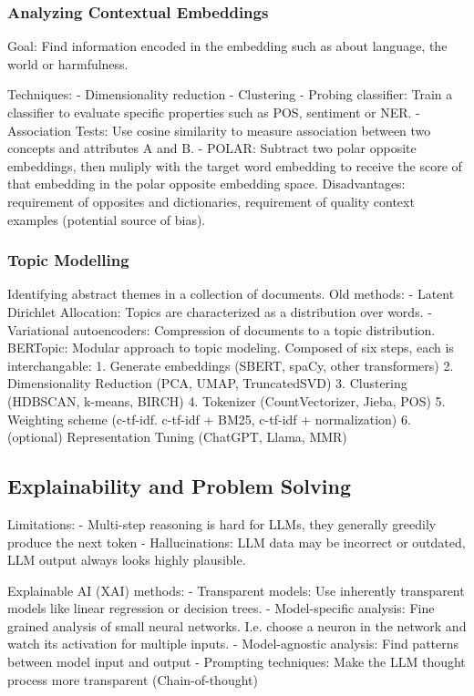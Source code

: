 \documentclass{scrartcl}
\begin{document}
\subsubsection*{Analyzing Contextual Embeddings}
Goal: Find information encoded in the embedding such as about language, the world or harmfulness.

Techniques:
- Dimensionality reduction
- Clustering
- Probing classifier: Train a classifier to evaluate specific properties such as POS, sentiment or NER.
- Association Tests: Use cosine similarity to measure association between two concepts and attributes A and B.
- POLAR: Subtract two polar opposite embeddings, then muliply with the target word embedding to receive the score of that embedding in the polar opposite embedding space. Disadvantages: requirement of opposites and dictionaries, requirement of quality context examples (potential source of bias).

\subsubsection*{Topic Modelling}
Identifying abstract themes in a collection of documents.
Old methods:
- Latent Dirichlet Allocation: Topics are characterized as a distribution over words.
- Variational autoencoders: Compression of documents to a topic distribution.
BERTopic:
Modular approach to topic modeling. Composed of six steps, each is interchangable:
1. Generate embeddings (SBERT, spaCy, other transformers)
2. Dimensionality Reduction (PCA, UMAP, TruncatedSVD)
3. Clustering (HDBSCAN, k-means, BIRCH)
4. Tokenizer (CountVectorizer, Jieba, POS)
5. Weighting scheme (c-tf-idf. c-tf-idf + BM25, c-tf-idf + normalization)
6. (optional) Representation Tuning (ChatGPT, Llama, MMR)

\subsection{Explainability and Problem Solving}
Limitations:
- Multi-step reasoning is hard for LLMs, they generally greedily produce the next token
- Hallucinations: LLM data may be incorrect or outdated, LLM output always looks highly plausible.

Explainable AI (XAI) methods:
- Transparent models: Use inherently transparent models like linear regression or decision trees.
- Model-specific analysis: Fine grained analysis of small neural networks. I.e. choose a neuron in the network and watch its activation for multiple inputs.
- Model-agnostic analysis: Find patterns between model input and output
- Prompting techniques: Make the LLM thought process more transparent (Chain-of-thought)
\end{document}
